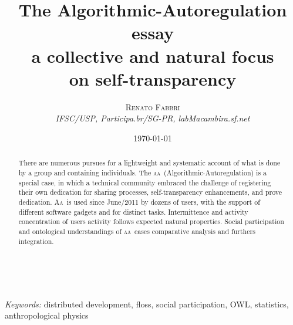 \documentclass[a4paper, 11pt]{article} %
\title{\textbf{The Algorithmic-Autoregulation essay}\\ %
a collective and natural focus\\ on self-transparency} %
\author{\textsc{Renato Fabbri} %
\\{\textit{IFSC/USP, Participa.br/SG-PR, labMacambira.sf.net}}} %
\date{\today} %
\makeatletter
\newcommand{\aab}{\textsc{aa}}
\newcommand{\aai}{\textsc{Aa}}
\renewcommand{\maketitle}{ %
\begin{flushright} %
{\LARGE\@title} %

\vspace{50pt} %

{\large\@author} %
\\\@date %

\vspace{40pt} %
\end{flushright}
}
\makeatother
\begin{document}
\maketitle %




\begin{abstract}
    There are numerous pursues for a lightweight and systematic account of what is done by a group and containing individuals. The \aab\ (Algorithmic-Autoregulation) is a special case, in which a technical community embraced the challenge of registering their own dedication for sharing processes, self-transparency enhancements, and prove dedication. \aai\ is used since June/2011 by dozens of users, with the support of different software gadgets and for distinct tasks. Intermittence and activity concentration of users activity follows expected natural properties. Social participation and ontological understandings of \aab\ eases comparative analysis and furthers integration.
\end{abstract}

{
\begin{abstract}

\end{abstract}
}

\hspace*{3,6mm}\textit{Keywords:} distributed development, floss, social participation, OWL, statistics, anthropological physics %


\newpage
\tableofcontents
\end{document}
